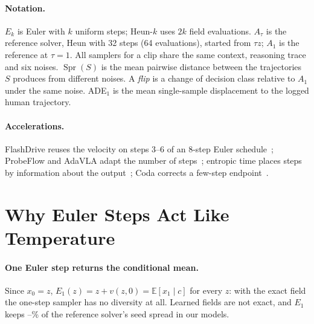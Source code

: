 \documentclass{article}
\theoremstyle{plain}
\theoremstyle{definition}
\theoremstyle{remark}
\newcommand{\Aref}{A_{1}}
\newcommand{\Atau}{A_{\tau}}
\newcommand{\Spr}{\operatorname{Spr}}
\newcommand{\E}{\mathbb{E}}
\begin{document}
\paragraph{Notation.} $E_k$ is Euler with $k$ uniform steps; Heun-$k$ uses $2k$ field evaluations. $\Atau$ is the reference solver, Heun with 32 steps (64 evaluations), started from $\tau z$; $\Aref$ is the reference at $\tau=1$. All samplers for a clip share the same context, reasoning trace and six noises. $\Spr(S)$ is the mean pairwise distance between the trajectories $S$ produces from different noises. A \emph{flip} is a change of decision class relative to $\Aref$ under the same noise. ADE$_1$ is the mean single-sample displacement to the logged human trajectory.

\paragraph{Accelerations.} FlashDrive reuses the velocity on steps 3--6 of an 8-step Euler schedule~\citep{flashdrive2026}; ProbeFlow and AdaVLA adapt the number of steps~\citep{probeflow2026,adavla2026}; entropic time places steps by information about the output~\citep{stancevic2025entropic}; Coda corrects a few-step endpoint~\citep{coda2026}.

\section{Why Euler Steps Act Like Temperature}
\label{sec:theory}

\paragraph{One Euler step returns the conditional mean.} Since $x_0=z$, $E_1(z)=z+v(z,0)=\E[x_1\mid c]$ for every $z$: with the exact field the one-step sampler has no diversity at all. Learned fields are not exact, and $E_1$ keeps \EOneSpreadMin--\EOneSpreadMax\% of the reference solver's seed spread in our models.
\end{document}
